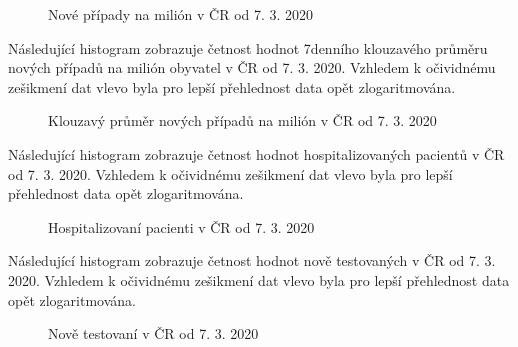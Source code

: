\documentclass[a4paper, 12pt]{article}
\begin{document}

\begin{figure}[H]
\centering
{}
\qquad
{}
\caption{Nové případy na milión v ČR od 7. 3. 2020}
\end{figure}


Následující histogram zobrazuje četnost hodnot 7denního klouzavého průměru nových případů na milión obyvatel v ČR od 7. 3. 2020.
Vzhledem k očividnému zešikmení dat vlevo byla pro lepší přehlednost data opět zlogaritmována.


\begin{figure}[H]
\centering
{}
\qquad
{}
\caption{Klouzavý průměr nových případů na milión v ČR od 7. 3. 2020}
\end{figure}


Následující histogram zobrazuje četnost hodnot hospitalizovaných pacientů v ČR od 7. 3. 2020.
Vzhledem k očividnému zešikmení dat vlevo byla pro lepší přehlednost data opět zlogaritmována.



\begin{figure}[H]
\centering
{}
\qquad
{}
\caption{Hospitalizovaní pacienti v ČR od 7. 3. 2020}
\end{figure}

Následující histogram zobrazuje četnost hodnot nově testovaných v ČR od 7. 3. 2020.
Vzhledem k očividnému zešikmení dat vlevo byla pro lepší přehlednost data opět zlogaritmována.


\begin{figure}[H]
\centering
{}
\qquad
{}
\caption{Nově testovaní v ČR od 7. 3. 2020}
\end{figure}
\end{document}
